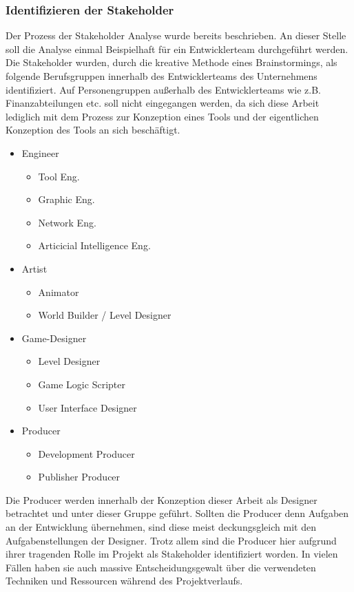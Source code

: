 \documentclass[pagesize, paper=a4, fontsize=12pt, titlepage=true, headings=small, headnosepline, abstractoff, liststotoc, nochapterprefix, plainheadsepline, twoside]{scrreprt}
\begin{document}
\subsubsection{Identifizieren der Stakeholder}
Der Prozess der Stakeholder Analyse wurde bereits beschrieben. An dieser Stelle soll die Analyse einmal Beispielhaft für ein Entwicklerteam durchgeführt werden. Die Stakeholder wurden, durch die kreative Methode eines Brainstormings, als folgende Berufsgruppen innerhalb des Entwicklerteams des Unternehmens identifiziert. Auf Personengruppen außerhalb des Entwicklerteams wie z.B. Finanzabteilungen etc. soll nicht eingegangen werden, da sich diese Arbeit lediglich mit dem Prozess zur Konzeption eines Tools und der eigentlichen Konzeption des Tools an sich beschäftigt.
\begin{itemize}
\item Engineer
	\begin{itemize}
	\item Tool Eng.
	\item Graphic Eng.
	\item Network Eng.
	\item Articicial Intelligence Eng.
	\end{itemize}
\item Artist
	\begin{itemize}
	\item Animator
	\item World Builder / Level Designer
	\end{itemize}
\item Game-Designer
	\begin{itemize}
	\item Level Designer
	\item Game Logic Scripter
	\item User Interface Designer
	\end{itemize}
\item Producer
	\begin{itemize}
	\item Development Producer
	\item Publisher Producer
	\end{itemize}
\end{itemize}
Die Producer werden innerhalb der Konzeption dieser Arbeit als Designer betrachtet und unter dieser Gruppe geführt. Sollten die Producer denn Aufgaben an der Entwicklung übernehmen, sind diese meist deckungsgleich mit den Aufgabenstellungen der Designer. Trotz allem sind die Producer hier aufgrund ihrer tragenden Rolle im Projekt als Stakeholder identifiziert worden. In vielen Fällen haben sie auch massive Entscheidungsgewalt über die verwendeten Techniken und Ressourcen während des Projektverlaufs.
\end{document}
